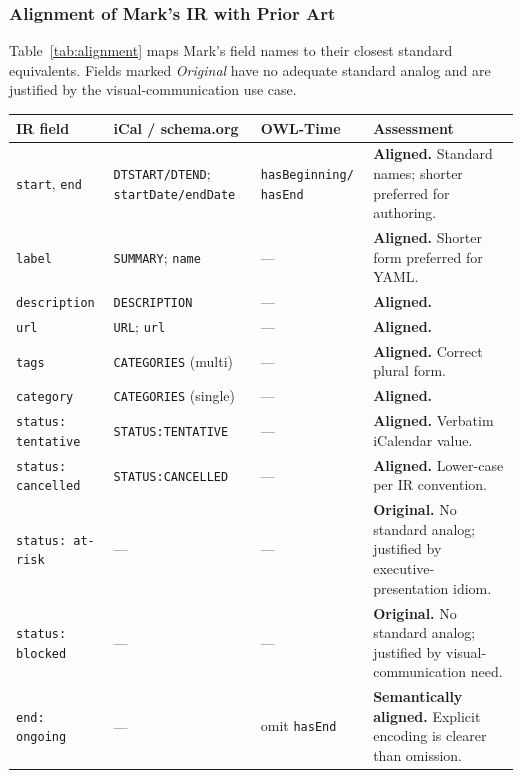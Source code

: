 \subsubsection{Alignment of Mark's IR with Prior Art}

Table~\ref{tab:alignment} maps Mark's field names to their closest standard
equivalents. Fields marked \emph{Original} have no adequate standard analog
and are justified by the visual-communication use case.

\begin{table}[h]
\centering
\small
\begin{tabular}{p{2.4cm}p{3.0cm}p{2.0cm}p{4.0cm}}
\toprule
\textbf{IR field} & \textbf{iCal / schema.org} & \textbf{OWL-Time} & \textbf{Assessment} \\
\midrule
\texttt{start}, \texttt{end}
  & \texttt{DTSTART/DTEND}; \texttt{startDate/endDate}
  & \texttt{hasBeginning/} \texttt{hasEnd}
  & \textbf{Aligned.} Standard names; shorter preferred for authoring. \\
\texttt{label}
  & \texttt{SUMMARY}; \texttt{name}
  & ---
  & \textbf{Aligned.} Shorter form preferred for YAML. \\
\texttt{description}
  & \texttt{DESCRIPTION}
  & ---
  & \textbf{Aligned.} \\
\texttt{url}
  & \texttt{URL}; \texttt{url}
  & ---
  & \textbf{Aligned.} \\
\texttt{tags}
  & \texttt{CATEGORIES} (multi)
  & ---
  & \textbf{Aligned.} Correct plural form. \\
\texttt{category}
  & \texttt{CATEGORIES} (single)
  & ---
  & \textbf{Aligned.} \\
\texttt{status: tentative}
  & \texttt{STATUS:TENTATIVE}
  & ---
  & \textbf{Aligned.} Verbatim iCalendar value. \\
\texttt{status: cancelled}
  & \texttt{STATUS:CANCELLED}
  & ---
  & \textbf{Aligned.} Lower-case per IR convention. \\
\texttt{status: at-risk}
  & ---
  & ---
  & \textbf{Original.} No standard analog; justified by executive-presentation idiom. \\
\texttt{status: blocked}
  & ---
  & ---
  & \textbf{Original.} No standard analog; justified by visual-communication need. \\
\texttt{end: ongoing}
  & ---
  & omit \texttt{hasEnd}
  & \textbf{Semantically aligned.} Explicit encoding is clearer than omission. \\

\end{tabular}
\end{table}
